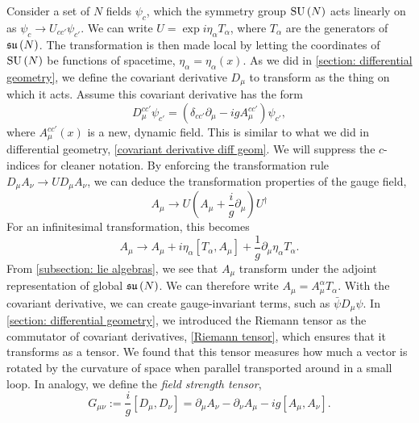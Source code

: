 Consider a set of $N$ fields $\psi_c$, which the symmetry group $\text{SU}\left(N\right)$ acts linearly on as $\psi_c \rightarrow U_{cc'} \psi_{c'}$.
We can write $U = \exp{i \eta_\alpha T_\alpha}$, where $T_\alpha$ are the generators of $\mathfrak{su}\left(N\right)$.
The transformation is then made local by letting the coordinates of $\text{SU}\left(N\right)$ be functions of spacetime, $\eta_\alpha = \eta_\alpha(x)$.
As we did in \autoref{section: differential geometry}, we define the covariant derivative $D_\mu$ to transform as the thing on which it acts.
Assume this covariant derivative has the form
%
\begin{equation}
    \label{covariant derivative Yang-Mills}
    D_\mu^{cc'} \psi_{c'} = (\delta_{cc'}\partial_\mu - i g A_\mu^{cc'} )\psi_{c'},
\end{equation}
%
where $A_\mu^{cc'}(x)$ is a new, dynamic field.
This is similar to what we did in differential geometry, \autoref{covariant derivative diff geom}.
We will suppress the $c$-indices for cleaner notation.
By enforcing the transformation rule $D_\mu A_\nu \rightarrow U D_\mu A_\nu$, we can deduce the transformation properties of the gauge field, 
%
\begin{equation}
    \label{Gauge transformation gauge field}
    A_\mu\rightarrow U \left(A_\mu + \frac{i}{g} \partial_\mu\right) U^\dagger
\end{equation}
%
For an infinitesimal transformation, this becomes
%
\begin{equation}
    A_\mu \rightarrow A_\mu + i \eta_\alpha [T_\alpha, A_\mu] + \frac{1}{g} \partial_\mu \eta_\alpha T_\alpha.
\end{equation}
%
From \autoref{subsection: lie algebras}, we see that $A_\mu$ transform under the adjoint representation of global $\mathfrak{su}\left(N\right)$.
We can therefore write $A_\mu = A_\mu^\alpha T_\alpha$.
With the covariant derivative, we can create gauge-invariant terms, such as $\bar \psi D_\mu \psi$.
In \autoref{section: differential geometry}, we introduced the Riemann tensor as the commutator of covariant derivatives, \autoref{Riemann tensor}, which ensures that it transforms as a tensor.
We found that this tensor measures how much a vector is rotated by the curvature of space when parallel transported around in a small loop.
In analogy, we define the \emph{field strength tensor},
%
\begin{equation}
    G_{\mu \nu} := \frac{i}{g} [D_\mu, D_\nu]
    = \partial_\mu A_\nu - \partial_\nu A_\mu - i g[A_\mu, A_\nu].
\end{equation}
